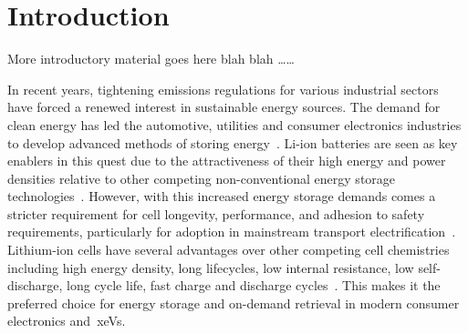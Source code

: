 
\clearpage
\chapter{Introduction}\label{ch:intro}

More introductory material goes here blah blah \dots \dots






In  recent  years,  tightening  emissions  regulations  for  various  industrial
sectors  have  forced   a  renewed  interest  in   sustainable  energy  sources.
The   demand  for   clean  energy   has  led   the  automotive,   utilities  and
consumer  electronics   industries  to  develop  advanced   methods  of  storing
energy~\cite{Weiss2011}.  Li-ion   batteries  are   seen  as  key   enablers  in
this  quest  due   to  the  attractiveness  of  their  high   energy  and  power
densities   relative  to   other  competing   non-conventional  energy   storage
technologies~\cite{Ibrahim2008}.  However, with  this  increased energy  storage
demands  comes  a stricter  requirement  for  cell longevity,  performance,  and
adhesion  to  safety  requirements,  particularly  for  adoption  in  mainstream
transport  electrification~\cite{Andrea2010}.  Lithium-ion  cells  have  several
advantages over other competing cell  chemistries including high energy density,
long lifecycles, low  internal resistance, low self-discharge,  long cycle life,
fast charge  and discharge cycles~\cite{Reddy2011,Plett2015}. This  makes it the
preferred choice for  energy storage and on-demand retrieval  in modern consumer
electronics and~\glspl{xeV}.


